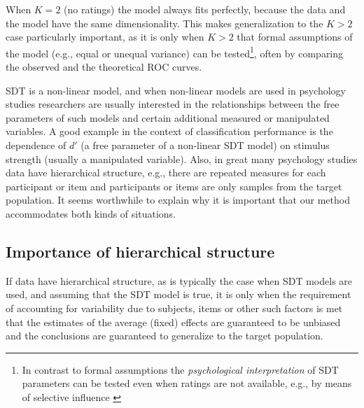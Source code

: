 \documentclass[oneside,a4paper]{article}
\begin{document}
When $K = 2$ (no ratings) the model always fits perfectly, because the
data and the model have the same dimensionality. This makes
generalization to the $K > 2$ case particularly important, as it is
only when $K > 2$ that formal assumptions of the model (e.g., equal or
unequal variance) can be tested\footnote{In contrast to formal
  assumptions the \emph{psychological interpretation} of SDT
  parameters can be tested even when ratings are not available, e.g.,
  by means of selective influence \cite{sternberg2001separate}}, often
by comparing the observed and the theoretical ROC
curves. %

SDT is a non-linear model, and when non-linear models are used in
psychology studies researchers are usually interested in the
relationships between the free parameters of such models and certain
additional measured or manipulated variables. A good example in the
context of classification performance is the dependence of $d'$ (a
free parameter of a non-linear SDT model) on stimulus strength
(usually a manipulated variable). Also, in great many psychology
studies data have hierarchical structure, e.g., there are repeated
measures for each participant or item and participants or items are
only samples from the target population. It seems worthwhile to
explain why it is important that our method accommodates both kinds of
situations.

\subsection{Importance of hierarchical structure}

If data have hierarchical structure, as is typically the case when SDT
models are used, and assuming that the SDT model is true, it is only
when the requirement of accounting for variability due to subjects,
items or other such factors is met that the estimates of the average
(fixed) effects are guaranteed to be unbiased and the conclusions are
guaranteed to generalize to the target population.
\end{document}
